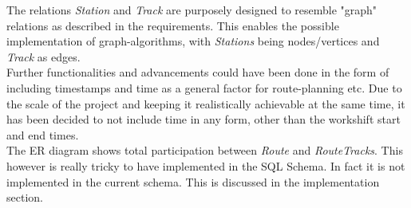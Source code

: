 The relations \emph{Station} and \emph{Track} are purposely designed to resemble "graph" relations as described in the requirements. This enables the possible implementation of graph-algorithms, with \emph{Stations} being nodes/vertices and \emph{Track} as edges.
\\[12pt]
Further functionalities and advancements could have been done in the form of including timestamps and time as a general factor for route-planning etc. Due to the scale of the project and keeping it realistically achievable at the same time, it has been decided to not include time in any form, other than the workshift start and end times.\\
The ER diagram shows total participation between \emph{Route} and 
\emph{RouteTracks}. This however is really tricky to have implemented in the 
SQL Schema. In fact it is not implemented in the current schema. This is 
discussed in the implementation section.

